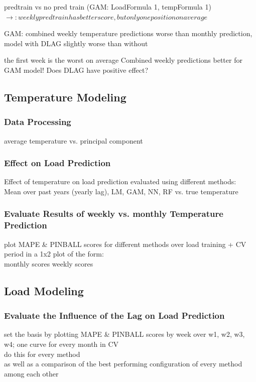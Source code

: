 \documentclass[conference]{IEEEtran}
\begin{document}
predtrain vs no pred train (GAM: LoadFormula 1, tempFormula 1)
$\rightarrow: weekly predtrain has better score, but only one position on average$

GAM: combined weekly temperature predictions worse than monthly prediction, model with DLAG slightly worse than without 

the first week is the worst on average
Combined weekly predictions better for GAM model! Does DLAG have positive effect? 

\subsection{Temperature Modeling}
\subsubsection{Data Processing}
average temperature vs. principal component

\subsubsection{Effect on Load Prediction}
Effect of temperature on load prediction evaluated using different methods:\\
Mean over past years (yearly lag), LM, GAM, NN, RF vs. true temperature

\subsubsection{Evaluate Results of weekly vs. monthly Temperature Prediction}
plot MAPE \& PINBALL scores for different methods over load training + CV period in a 1x2 plot of the form:\\
monthly scores \quad weekly scores

\subsection{Load Modeling}

\subsubsection{Evaluate the Influence of the Lag on Load Prediction}
set the basis by plotting MAPE \& PINBALL scores by week over w1, w2, w3, w4; one curve for every month in CV\\
do this for every method\\
as well as a comparison of the best performing configuration of every method among each other\\
\end{document}
